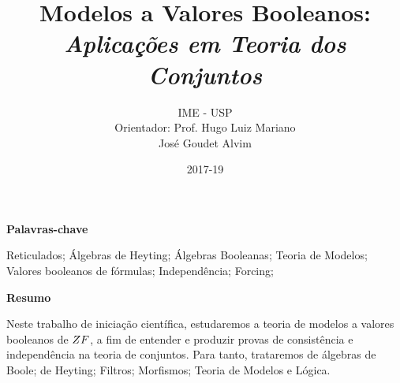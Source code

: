 \documentclass[12pt]{report}
\title{{\bf Modelos a Valores Booleanos:}\\ \em Aplicações em Teoria dos Conjuntos}
\author{
    {\LARGE IME - USP}\\
    {Orientador: Prof. Hugo Luiz Mariano}\\
                    José Goudet Alvim
}
\date{2017-19}
\begin{document}
    \maketitle
    \justify
    \begin{center}{\bf Palavras-chave}\end{center}
        Reticulados; Álgebras de Heyting; Álgebras Booleanas; 
        Teoria de Modelos; Valores booleanos de fórmulas; 
        Independência; Forcing;
    \begin{center}{\bf Resumo}\end{center}
        Neste trabalho de iniciação científica, estudaremos 
        a teoria de modelos a valores booleanos de $\sc ZF$, 
        a fim de entender e produzir provas de consistência 
        e independência na teoria de conjuntos. Para tanto, 
        trataremos de álgebras de Boole; de Heyting; Filtros; 
        Morfismos; Teoria de Modelos e Lógica.
    \cls
    
    \tableofcontents
    \cls
    
    
\end{document}
